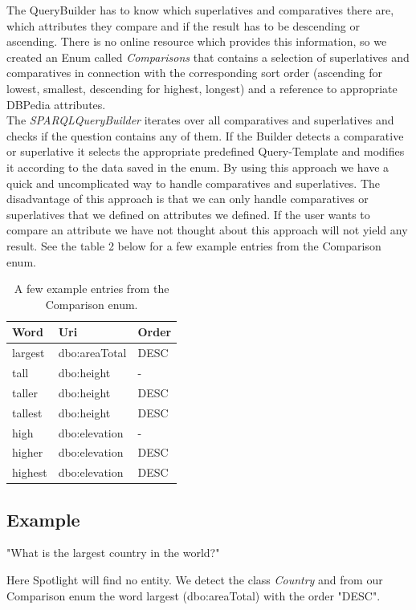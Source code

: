 \documentclass[runningheads]{llncs}
\begin{document}
The QueryBuilder has to know which superlatives and comparatives there are, which attributes they compare and if the result has to be descending or ascending. There is no online resource which provides this information, so we created an Enum called \emph{Comparisons} that contains a selection of superlatives and comparatives in connection with the corresponding sort order (ascending for lowest, smallest, descending for highest, longest) and a reference to appropriate DBPedia attributes. \\

The \emph{SPARQLQueryBuilder} iterates over all comparatives and superlatives and checks if the question contains any of them. If the Builder detects a comparative or superlative it selects the appropriate predefined Query-Template and modifies it according to the data saved in the enum. By using this approach we have a quick and uncomplicated way to handle comparatives and superlatives. The disadvantage of this approach is that we can only handle comparatives or superlatives that we defined on attributes we defined. If the user wants to compare an attribute we have not thought about this approach will not yield any result. See the table 2 below for a few example entries from the Comparison enum.

\begin{table}
	\caption{A few example entries from the Comparison enum.}\label{tab1}
	\begin{center}
		\begin{tabularx}{\textwidth}{@{}|Y|Y|Y|@{}}
			\hline
			\textbf{Word} &  \textbf{Uri} &  \textbf{Order}\\
			\hline
			largest &  dbo:areaTotal & DESC \\
			\hline
			tall &  dbo:height & - \\
			\hline
			taller &  dbo:height & DESC\\
			\hline
			tallest &  dbo:height & DESC\\
			\hline
			high &  dbo:elevation & - \\
			\hline
			higher &  dbo:elevation & DESC\\
			\hline
			highest &  dbo:elevation & DESC\\
			\hline
		\end{tabularx}
	\end{center}
\end{table}


\subsection{Example}
\begin{example}
	"What is the largest country in the world?"\end{example}
Here Spotlight will find no entity. We detect the class \textit{Country} and from our Comparison enum the word 
largest (dbo:areaTotal) with the order "DESC". 
\end{document}
